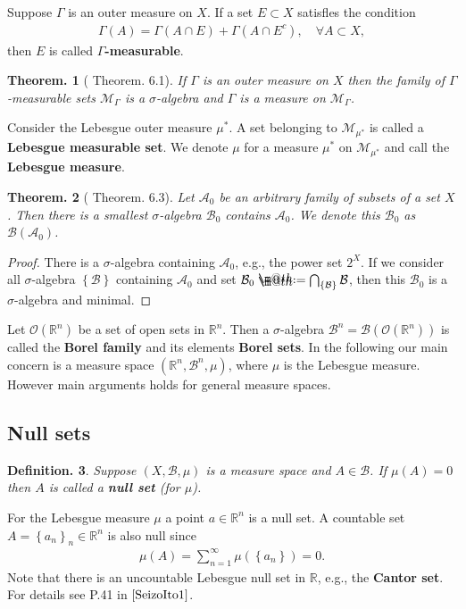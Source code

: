 \documentclass[openany, a4paper, oneside]{book}
\makeatletter
\newcommand*{\defeq}{\mathrel{\rlap{%
\raisebox{0.3ex}{$\m@th\cdot$}}%
\raisebox{-0.3ex}{$\m@th\cdot$}}%
=}
\theoremstyle{break}
\newtheorem{thm}{Theorem.}[section]
\theoremstyle{breakdefn}
\newtheorem{defn}[thm]{Definition.}
\newcommand{\rbk}[1]{\left (#1\right)}
\newcommand{\cbk}[1]{\left\{#1\right\}}
\newcommand{\bbR}{\mathbb{R}}
\newcommand{\bbRn}{\mathbb{R}^n}
\newcommand{\calA}{\mathcal{A}}
\newcommand{\calB}{\mathcal{B}}
\newcommand{\calM}{\mathcal{M}}
\newcommand{\calO}{\mathcal{O}}
\newcommand{\upbf}[1]{\textup{\textbf{#1}}}
\makeatother
\begin{document}
Suppose $\Gamma$ is an outer measure on $X$.
If a set $E \subset X$ satisfles the condition
\begin{align}
 \Gamma (A)
 =
 \Gamma \rbk{A \cap E} + \Gamma \rbk{A \cap E^{c}},
 \quad \forall A \subset X,
\end{align}
then $E$ is called \upbf{$\Gamma$-measurable}.
\begin{thm}[\cite{SeizoIto1} Theorem. 6.1]
 If $\Gamma$ is an outer measure on $X$ then the family of $\Gamma$-measurable sets $\calM_{\Gamma}$ is
 a $\sigma$-algebra and $\Gamma$ is a measure on $\calM_{\Gamma}$.
\end{thm}
Consider the Lebesgue outer measure $\mu^*$.
A set belonging to $\calM_{\mu^*}$ is called a \textbf{Lebesgue measurable set}.
We denote $\mu$ for a measure $\mu^*$ on $\calM_{\mu^*}$ and call the \textbf{Lebesgue measure}.
\begin{thm}[\cite{SeizoIto1} Theorem. 6.3]
 Let $\calA_0$ be an arbitrary family of subsets of a set $X$.
 Then there is a smallest $\sigma$-algebra $\calB_0$ contains $\calA_0$.
 We denote this $\calB_0$ as $\calB (\calA_0)$.
\end{thm}
\begin{proof}
There is a $\sigma$-algebra containing $\calA_0$, e.g., the power set $2^X$.
If we consider all $\sigma$-algebra $\cbk{\calB}$ containing $\calA_0$ and
set $\calB_0 \defeq \bigcap_{\cbk{\calB}} \calB$,
then this $\calB_0$ is a $\sigma$-algebra and minimal.
\end{proof}

Let $\calO (\bbRn)$ be a set of open sets in $\bbRn$.
Then a $\sigma$-algebra $\calB^n = \calB (\calO (\bbRn))$ is called the \upbf{Borel family}
and its elements \upbf{Borel sets}.
In the following our main concern is a measure space $(\bbRn, \calB^n, \mu)$,
where $\mu$ is the Lebesgue measure.
However main arguments holds for general measure spaces.
\subsection{Null sets}
\label{sec-7-1-2-4}

\begin{defn}
 Suppose $(X, \calB, \mu)$ is a measure space and $A \in \calB$.
 If $\mu (A) = 0$ then $A$ is called a \upbf{null set} (for $\mu$).
\end{defn}
For the Lebesgue measure $\mu$ a point $a \in \bbRn$ is a null set.
A countable set $A = \cbk{a_n}_n \in \bbRn$ is also null since
\begin{align}
 \mu (A)
 =
 \sum_{n=1}^{\infty} \mu \rbk{\cbk{a_n}}
 = 0.
\end{align}
Note that there is an uncountable Lebesgue null set in $\bbR$, e.g., the \textbf{Cantor set}.
For details see P.41 in $\cite{SeizoIto1}$.
\end{document}
